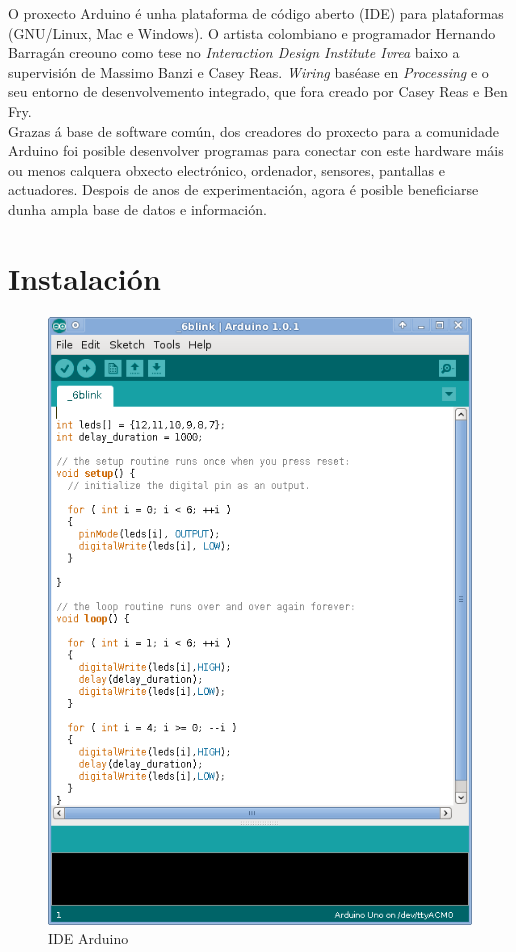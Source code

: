 O proxecto Arduino é unha plataforma de código aberto (IDE) para plataformas
(GNU/Linux, Mac e Windows). O artista colombiano e programador
Hernando Barragán creouno como tese no
\textit{Interaction Design Institute Ivrea} baixo a supervisión de
Massimo Banzi e Casey Reas. \textit{Wiring} baséase en \textit{Processing} e o
seu entorno de desenvolvemento integrado, que fora creado por Casey Reas e Ben
Fry. \\

Grazas á base de software común, dos creadores do proxecto para a comunidade
Arduino foi posible desenvolver programas para conectar con este hardware máis
ou menos calquera obxecto electrónico, ordenador, sensores, pantallas e
actuadores. Despois de anos de experimentación, agora é posible beneficiarse
dunha ampla base de datos e información.

\section{Instalación}

\begin{figure}[htbp]
 \centering
 \includegraphics[scale=0.3,keepaspectratio=true]{./imagenes/arduino-sketch.png}
 \caption{IDE Arduino}
 \label{figura:ArduinoSketch}
\end{figure}

